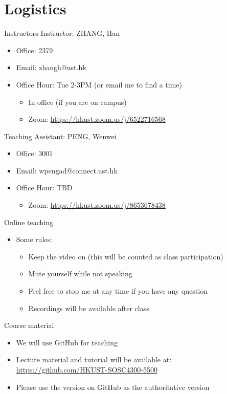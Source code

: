 \documentclass[handout]{beamer}
\begin{document}
\section{Logistics}
\label{h:9c6f21cf-6127-4034-8514-a7d7133014da}
\begin{frame}[label={h:f9275900-b43f-404d-91a6-f0f21c5aadce}]{Instructors}
\alert{Instructor}: ZHANG, Han
\begin{itemize}
\item Office: 2379
\item Email: zhangh@ust.hk
\item Office Hour: Tue 2-3PM (or email me to find a time)
\begin{itemize}
\item In office (if you are on campus)
\item Zoom: \url{https://hkust.zoom.us/j/6522716568}
\end{itemize}
\end{itemize}


\alert{Teaching Assistant}: PENG, Wenwei

\begin{itemize}
\item Office: 3001
\item Email: wpengad@connect.ust.hk
\item Office Hour: TBD
\begin{itemize}
\item Zoom: \url{https://hkust.zoom.us/j/8653678438}
\end{itemize}
\end{itemize}
\end{frame}

\begin{frame}[label={h:769F09D5-2DD4-4370-A17F-DA0382FFE02B}]{Online teaching}
\begin{itemize}
\item Some rules:
\begin{itemize}
\item Keep the video on (this will be counted as class participation)
\item Mute yourself while not speaking
\item Feel free to stop me at any time if you have any question
\item Recordings will be available after class
\end{itemize}
\end{itemize}
\end{frame}

\begin{frame}[label={h:46e1cba6-547f-41f8-a5e2-1130a5074a75}]{Course material}
\begin{itemize}
\item We will use GitHub for teaching
\item Lecture material and tutorial will be available at: \url{https://github.com/HKUST-SOSC4300-5500}
\item Please use the version on GitHub as the authoritative version
\end{itemize}
\end{frame}
\end{document}
